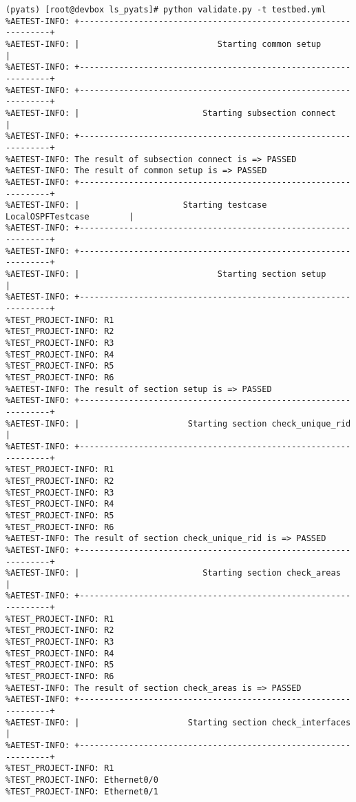 \begin{verbatim}
(pyats) [root@devbox ls_pyats]# python validate.py -t testbed.yml
%AETEST-INFO: +----------------------------------------------------------------+
%AETEST-INFO: |                            Starting common setup               |
%AETEST-INFO: +----------------------------------------------------------------+
%AETEST-INFO: +----------------------------------------------------------------+
%AETEST-INFO: |                         Starting subsection connect            |
%AETEST-INFO: +----------------------------------------------------------------+
%AETEST-INFO: The result of subsection connect is => PASSED
%AETEST-INFO: The result of common setup is => PASSED
%AETEST-INFO: +----------------------------------------------------------------+
%AETEST-INFO: |                     Starting testcase LocalOSPFTestcase        |
%AETEST-INFO: +----------------------------------------------------------------+
%AETEST-INFO: +----------------------------------------------------------------+
%AETEST-INFO: |                            Starting section setup              |
%AETEST-INFO: +----------------------------------------------------------------+
%TEST_PROJECT-INFO: R1
%TEST_PROJECT-INFO: R2
%TEST_PROJECT-INFO: R3
%TEST_PROJECT-INFO: R4
%TEST_PROJECT-INFO: R5
%TEST_PROJECT-INFO: R6
%AETEST-INFO: The result of section setup is => PASSED
%AETEST-INFO: +----------------------------------------------------------------+
%AETEST-INFO: |                      Starting section check_unique_rid         |
%AETEST-INFO: +----------------------------------------------------------------+
%TEST_PROJECT-INFO: R1
%TEST_PROJECT-INFO: R2
%TEST_PROJECT-INFO: R3
%TEST_PROJECT-INFO: R4
%TEST_PROJECT-INFO: R5
%TEST_PROJECT-INFO: R6
%AETEST-INFO: The result of section check_unique_rid is => PASSED
%AETEST-INFO: +----------------------------------------------------------------+
%AETEST-INFO: |                         Starting section check_areas           |
%AETEST-INFO: +----------------------------------------------------------------+
%TEST_PROJECT-INFO: R1
%TEST_PROJECT-INFO: R2
%TEST_PROJECT-INFO: R3
%TEST_PROJECT-INFO: R4
%TEST_PROJECT-INFO: R5
%TEST_PROJECT-INFO: R6
%AETEST-INFO: The result of section check_areas is => PASSED
%AETEST-INFO: +----------------------------------------------------------------+
%AETEST-INFO: |                      Starting section check_interfaces         |
%AETEST-INFO: +----------------------------------------------------------------+
%TEST_PROJECT-INFO: R1
%TEST_PROJECT-INFO: Ethernet0/0
%TEST_PROJECT-INFO: Ethernet0/1

\end{verbatim}
